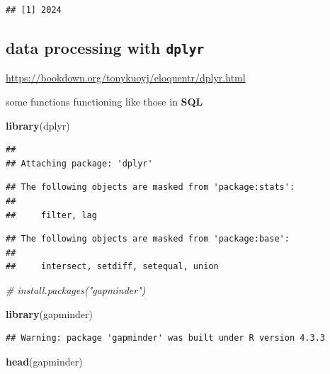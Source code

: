 \documentclass[
]{book}
\newenvironment{Shaded}{\begin{snugshade}}{\end{snugshade}}
\newcommand{\CommentTok}[1]{\textcolor[rgb]{0.56,0.35,0.01}{\textit{#1}}}
\newcommand{\FunctionTok}[1]{\textcolor[rgb]{0.13,0.29,0.53}{\textbf{#1}}}
\newcommand{\NormalTok}[1]{#1}
\theoremstyle{definition}
\theoremstyle{definition}
\theoremstyle{definition}
\theoremstyle{definition}
\theoremstyle{remark}
\begin{document}
\begin{verbatim}
## [1] 2024
\end{verbatim}

\hypertarget{data-processing-with-dplyr}{%
\subsection{\texorpdfstring{data processing with \texttt{dplyr}}{data processing with dplyr}}\label{data-processing-with-dplyr}}

\url{https://bookdown.org/tonykuoyj/eloquentr/dplyr.html}

some functions functioning like those in \textbf{SQL}

\begin{Shaded}
\begin{Highlighting}[]
\FunctionTok{library}\NormalTok{(dplyr)}
\end{Highlighting}
\end{Shaded}

\begin{verbatim}
## 
## Attaching package: 'dplyr'
\end{verbatim}

\begin{verbatim}
## The following objects are masked from 'package:stats':
## 
##     filter, lag
\end{verbatim}

\begin{verbatim}
## The following objects are masked from 'package:base':
## 
##     intersect, setdiff, setequal, union
\end{verbatim}

\begin{Shaded}
\begin{Highlighting}[]
\CommentTok{\# install.packages("gapminder")}

\FunctionTok{library}\NormalTok{(gapminder)}
\end{Highlighting}
\end{Shaded}

\begin{verbatim}
## Warning: package 'gapminder' was built under R version 4.3.3
\end{verbatim}

\begin{Shaded}
\begin{Highlighting}[]
\FunctionTok{head}\NormalTok{(gapminder)}
\end{Highlighting}
\end{Shaded}
\end{document}

